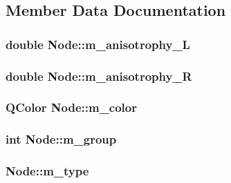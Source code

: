 \subsection{Member Data Documentation}
\hypertarget{class_node_a5948b728ed6427c25cf64340b18b337d}{
\subsubsection[{m\+\_\+anisotrophy\+\_\+\+L}]{\setlength{\rightskip}{0pt plus 5cm}double Node\+::m\+\_\+anisotrophy\+\_\+\+L}}\label{class_node_a5948b728ed6427c25cf64340b18b337d}
\hypertarget{class_node_aee39dd0e84a95339084197716d3d2d40}{
\subsubsection[{m\+\_\+anisotrophy\+\_\+\+R}]{\setlength{\rightskip}{0pt plus 5cm}double Node\+::m\+\_\+anisotrophy\+\_\+\+R}}\label{class_node_aee39dd0e84a95339084197716d3d2d40}
\hypertarget{class_node_a5663077fbe17bf9ee7615ae394f2981b}{
\subsubsection[{m\+\_\+color}]{\setlength{\rightskip}{0pt plus 5cm}Q\+Color Node\+::m\+\_\+color}}\label{class_node_a5663077fbe17bf9ee7615ae394f2981b}
\hypertarget{class_node_a3e068069e57916611009bddebafa47f1}{
\subsubsection[{m\+\_\+group}]{\setlength{\rightskip}{0pt plus 5cm}int Node\+::m\+\_\+group}}\label{class_node_a3e068069e57916611009bddebafa47f1}
\hypertarget{class_node_a0dd069dd1d5617c728bd5d836c80a9ce}{
\subsubsection[{m\+\_\+type}]{ Node\+::m\+\_\+type}}\label{class_node_a0dd069dd1d5617c728bd5d836c80a9ce}

